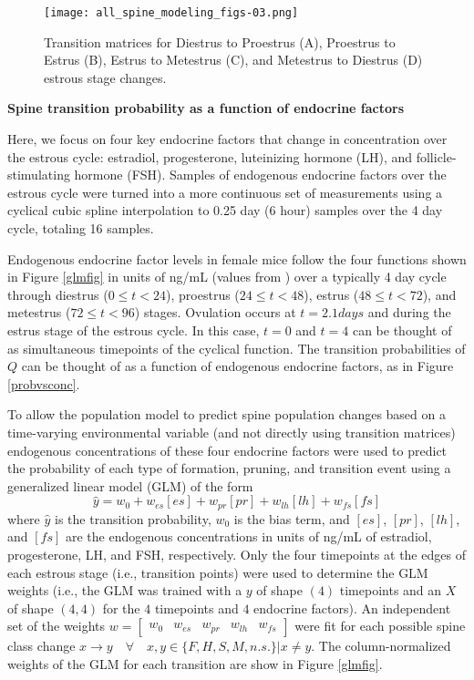 \documentclass[11pt]{article}
\begin{document}
\begin{figure}
	\centering
	\texttt{[image: all\_spine\_modeling\_figs-03.png]}
	\caption{Transition matrices for Diestrus to Proestrus (A), Proestrus to Estrus (B), Estrus to Metestrus (C), and Metestrus to Diestrus (D) estrous stage changes.}
	\label{transmats}
\end{figure}

\vspace{10pt}
\noindent \textbf{Spine transition probability as a function of endocrine factors}

Here, we focus on four key endocrine factors that change in concentration over the estrous cycle: estradiol, progesterone, luteinizing hormone (LH), and follicle-stimulating hormone (FSH). Samples of endogenous endocrine factors over the estrous cycle were turned into a more continuous set of measurements using a cyclical cubic spline interpolation to 0.25 day (6 hour) samples over the 4 day cycle, totaling 16 samples.

Endogenous endocrine factor levels in female mice follow the four functions shown in Figure \ref{glmfig} in units of ng/mL (values from \cite{e2_levels}) over a typically 4 day cycle through diestrus ($0\leq t < 24$), proestrus ($24\leq t < 48$), estrus ($48\leq t < 72$), and metestrus ($72\leq t < 96$) stages. Ovulation occurs at $t=2.1 days$ and during the estrus stage of the estrous cycle. In this case, $t=0$ and $t=4$ can be thought of as simultaneous timepoints of the cyclical function. The transition probabilities of $Q$ can be thought of as a function of endogenous endocrine factors, as in Figure \ref{probvsconc}.

To allow the population model to predict spine population changes based on a time-varying environmental variable (and not directly using transition matrices) endogenous concentrations of these four endocrine factors were used to predict the probability of each type of formation, pruning, and transition event using a generalized linear model (GLM) of the form
\begin{equation}
\hat{y}=w_0+w_{es}[es] + w_{pr}[pr] + w_{lh}[lh]+w_{fs}[fs]
\label{glm}
\end{equation}
where $\hat{y}$ is the transition probability, $w_0$ is the bias term,  and $[es]$, $[pr]$, $[lh]$, and $[fs]$ are the endogenous concentrations in units of ng/mL of estradiol, progesterone, LH, and FSH, respectively. Only the four timepoints at the edges of each estrous stage (i.e., transition points) were used to determine the GLM weights (i.e., the GLM was trained with a $y$ of shape $(4)$ timepoints and an $X$ of shape $(4,4)$ for the $4$ timepoints and $4$ endocrine factors). An independent set of the weights $w=\begin{bmatrix}w_0&w_{es}&w_{pr}&w_{lh}&w_{fs}\end{bmatrix}$ were fit for each possible spine class change $x\to y \quad \forall \quad x, y \in \{F, H, S, M, n.s.\} | x \neq y$. The column-normalized weights of the GLM for each transition are show in Figure \ref{glmfig}.
\end{document}
